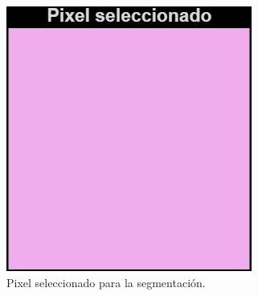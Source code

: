 \documentclass[11pt, letterpaper]{article}
\begin{document}
\begin{figure}[h!]
\begin{minipage}{0.35\textwidth}
		\includegraphics[width=\textwidth]{IMG/PIXEL.jpg}
		\caption*{Pixel seleccionado para la segmentación.}
	\end{minipage}
	
	\vspace{1em} %
	

\end{figure}
\end{document}
